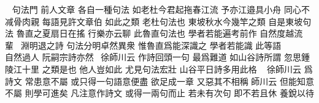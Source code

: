 \par\noindent
{}~%
句法門%
前人文章\gou%
各自一種句法\gou%
如老杜今君起拖春江流\gou%
予亦江邉具小舟\gou%
同心不减骨肉親\gou%
每語見許文章伯\gou%
如此之類\gou%
老杜句法也\gou%
東坡秋水今幾竿之類\gou%
自是東坡句法\gou%
魯直之夏扇日在搖\gou%
行樂亦云聊\gou%
此魯直句法也\gou%
學者若能遍考前作\gou%
自然度越流輩\gou~%
淵明退之詩\gou%
句法分明卓然異衆\gou%
惟魯直爲能深識之\gou%
學者若能識%
此等語\gou\\%
自然過人\gou%
阮嗣宗詩亦然\gou~%
徐師川云\gou%
作詩回頭一句\gou%
最爲難道\gou%
如山谷詩所謂\gou%
忽思鍾陵江十里%
之類是也\gou%
他人豈如此\gou%
尤見句法宏壯\gou%
山谷平日詩多用此格\gou%
~%
徐師川云\gou%
爲詩文\gou%
常患意不屬\gou%
或只得一句語意便盡\gou%
欲足成一章\gou%
又惡其不相稱\gou%
師川云\gou%
但能知意不屬\gou%
則學可進矣\gou%
凡注意作詩文\gou%
或得一兩句而止\gou%
若未有次句\gou%
即不若且休\gou%
養銳以待

\clearpage
{}
\endinput

\begin{minipage}<y>[htpb]{120mm}
\begin{tikzpicture}
\node [above,]  at%
	 (10,10) {\texttt{[image: 1.pdf]}};
\end{tikzpicture} %
\end{minipage}


